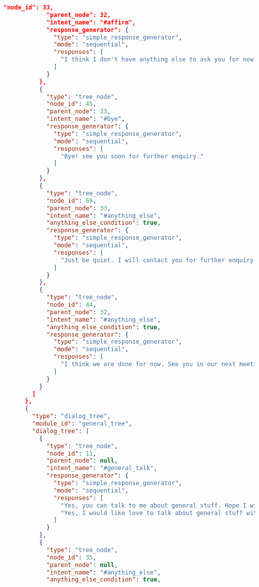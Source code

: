 \begin{appendix}
\begin{lstlisting}[language=json, firstnumber=1]
            "node_id": 33,
            "parent_node": 32,
            "intent_name": "#affirm",
            "response_generator": {
              "type": "simple_response_generator",
              "mode": "sequential",
              "responses": [
                "I think I don't have anything else to ask you for now. Once I will have the report, I will enquire you again. Bye!"
              ]
            }
          },
          {
            "type": "tree_node",
            "node_id": 45,
            "parent_node": 33,
            "intent_name": "#bye",
            "response_generator": {
              "type": "simple_response_generator",
              "mode": "sequential",
              "responses": [
                "Bye! see you soon for further enquiry."
              ]
            }
          },
          {
            "type": "tree_node",
            "node_id": 69,
            "parent_node": 33,
            "intent_name": "#anything_else",
            "anything_else_condition": true,
            "response_generator": {
              "type": "simple_response_generator",
              "mode": "sequential",
              "responses": [
                "Just be quiet. I will contact you for further enquiry later."
              ]
            }
          },
          {
            "type": "tree_node",
            "node_id": 44,
            "parent_node": 32,
            "intent_name": "#anything_else",
            "anything_else_condition": true,
            "response_generator": {
              "type": "simple_response_generator",
              "mode": "sequential",
              "responses": [
                "I think we are done for now. See you in our next meeting. I will not take your further queries till our next meeting."
              ]
            }
          }
        ]
      },
      {
        "type": "dialog_tree",
        "module_id": "general_tree",
        "dialog_tree": [
          {
            "type": "tree_node",
            "node_id": 11,
            "parent_node": null,
            "intent_name": "#general_talk",
            "response_generator": {
              "type": "simple_response_generator",
              "mode": "sequential",
              "responses": [
                "Yes, you can talk to me about general stuff. Hope I will answer you well.",
                "Yes, I would like love to talk about general stuff with you."
              ]
            }
          },
          {
            "type": "tree_node",
            "node_id": 35,
            "parent_node": null,
            "intent_name": "#anything_else",
            "anything_else_condition": true,

\end{lstlisting}
\end{appendix}
